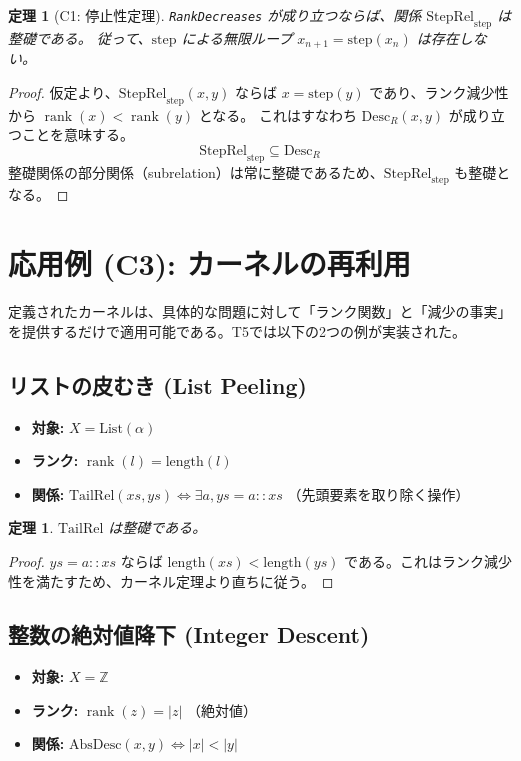 \documentclass[a4paper,11pt]{article}
\theoremstyle{definition}
\theoremstyle{plain}
\newtheorem{theorem}[definition]{定理}
\newcommand{\code}[1]{\texttt{#1}}
\newcommand{\rank}{\operatorname{rank}}
\newcommand{\Desc}{\mathrm{Desc}}
\newcommand{\StepRel}{\mathrm{StepRel}}
\newcommand{\step}{\mathrm{step}}
\newcommand{\Z}{\mathbb{Z}}
\newcommand{\List}{\mathrm{List}}
\begin{document}
\begin{theorem}[C1: 停止性定理]
\code{RankDecreases} が成り立つならば、関係 $\StepRel_{\step}$ は整礎である。
従って、$\step$ による無限ループ $x_{n+1} = \step(x_n)$ は存在しない。
\end{theorem}

\begin{proof}
仮定より、$\StepRel_{\step}(x, y)$ ならば $x = \step(y)$ であり、ランク減少性から $\rank(x) < \rank(y)$ となる。
これはすなわち $\Desc_R(x, y)$ が成り立つことを意味する。
\[ \StepRel_{\step} \subseteq \Desc_R \]
整礎関係の部分関係（subrelation）は常に整礎であるため、$\StepRel_{\step}$ も整礎となる。
\end{proof}

\section{応用例 (C3): カーネルの再利用}

定義されたカーネルは、具体的な問題に対して「ランク関数」と「減少の事実」を提供するだけで適用可能である。T5では以下の2つの例が実装された。

\subsection{リストの皮むき (List Peeling)}

\begin{itemize}
    \item \textbf{対象:} $X = \List(\alpha)$
    \item \textbf{ランク:} $\rank(l) = \mathrm{length}(l)$
    \item \textbf{関係:} $\mathrm{TailRel}(xs, ys) \iff \exists a, ys = a :: xs$ （先頭要素を取り除く操作）
\end{itemize}

\begin{theorem}
$\mathrm{TailRel}$ は整礎である。
\end{theorem}
\begin{proof}
$ys = a :: xs$ ならば $\mathrm{length}(xs) < \mathrm{length}(ys)$ である。これはランク減少性を満たすため、カーネル定理より直ちに従う。
\end{proof}

\subsection{整数の絶対値降下 (Integer Descent)}

\begin{itemize}
    \item \textbf{対象:} $X = \Z$
    \item \textbf{ランク:} $\rank(z) = |z|$ （絶対値）
    \item \textbf{関係:} $\mathrm{AbsDesc}(x, y) \iff |x| < |y|$
\end{itemize}
\end{document}
